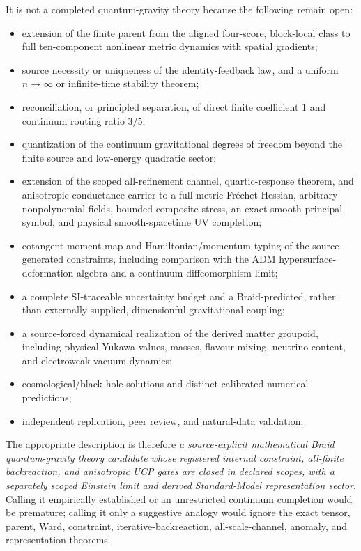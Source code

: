 \documentclass[11pt]{article}
\theoremstyle{definition}
\theoremstyle{remark}
\begin{document}
It is not a completed quantum-gravity theory because the following remain open:
\begin{itemize}
\item extension of the finite parent from the aligned four-score, block-local class to full ten-component nonlinear metric dynamics with spatial gradients;
\item source necessity or uniqueness of the identity-feedback law, and a uniform $n\to\infty$ or infinite-time stability theorem;
\item reconciliation, or principled separation, of direct finite coefficient $1$ and continuum routing ratio $3/5$;
\item quantization of the continuum gravitational degrees of freedom beyond the finite source and low-energy quadratic sector;
\item extension of the scoped all-refinement channel, quartic-response theorem, and anisotropic conductance carrier to a full metric Fr\'echet Hessian, arbitrary nonpolynomial fields, bounded composite stress, an exact smooth principal symbol, and physical smooth-spacetime UV completion;
\item cotangent moment-map and Hamiltonian/momentum typing of the source-generated constraints, including comparison with the ADM hypersurface-deformation algebra and a continuum diffeomorphism limit;
\item a complete SI-traceable uncertainty budget and a Braid-predicted, rather than externally supplied, dimensionful gravitational coupling;
\item a source-forced dynamical realization of the derived matter groupoid, including physical Yukawa values, masses, flavour mixing, neutrino content, and electroweak vacuum dynamics;
\item cosmological/black-hole solutions and distinct calibrated numerical predictions;
\item independent replication, peer review, and natural-data validation.
\end{itemize}

The appropriate description is therefore \emph{a source-explicit mathematical Braid quantum-gravity theory candidate whose registered internal constraint, all-finite backreaction, and anisotropic UCP gates are closed in declared scopes, with a separately scoped Einstein limit and derived Standard-Model representation sector}. Calling it empirically established or an unrestricted continuum completion would be premature; calling it only a suggestive analogy would ignore the exact tensor, parent, Ward, constraint, iterative-backreaction, all-scale-channel, anomaly, and representation theorems.
\end{document}
